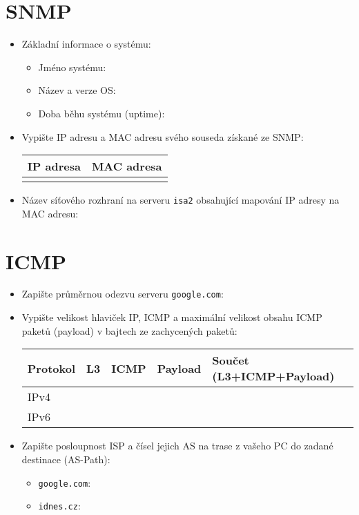 \section{SNMP}
\begin{itemize}
    \item Základní informace o systému:
    \begin{itemize}
        \item Jméno systému:
         \vspace{1cm}
        \item Název a verze OS:
         \vspace{1cm}
        \item Doba běhu systému (uptime):
         \vspace{1cm}
    \end{itemize}
    \item Vypište IP adresu a MAC adresu svého souseda získané ze SNMP:
    
\begin{tabular}{|p{5cm}|p{5cm}|}
\hline
IP adresa  & MAC adresa   \\ \hline
      &     \\   \hline
\end{tabular}
    \item Název síťového rozhraní na serveru {\tt isa2} obsahující mapování IP adresy na MAC adresu:
     \vspace{1cm}
\end{itemize}

\section{ICMP}
\begin{itemize}
    \item Zapište průměrnou odezvu serveru \texttt{google.com}:
    \item Vypište velikost hlaviček IP, ICMP a maximální velikost obsahu ICMP paketů (payload) v bajtech ze zachycených paketů:
    
    \begin{tabular}{|p{2cm}|p{2cm}|p{2cm}|l|l|}  \hline
     Protokol  & L3  & ICMP  & Payload & Součet (L3+ICMP+Payload) \\ \hline
     IPv4      &     &       &         &   \\   \hline
     IPv6      &     &       &         &     \\  \hline
\end{tabular}
    
    \item Zapište posloupnost ISP a čísel jejich AS na trase z vašeho PC do zadané destinace (AS-Path):
        \begin{itemize}
            \item \texttt{google.com}:
            \vspace{3cm}
            \item \texttt{idnes.cz}:
            \vspace{3cm}
        \end{itemize}
\end{itemize}
